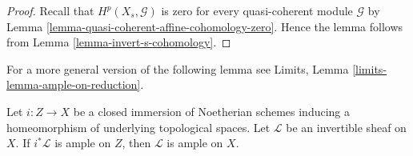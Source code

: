 \begin{proof}
Recall that $H^p(X_s, \mathcal{G})$ is zero for every quasi-coherent
module $\mathcal{G}$ by
Lemma \ref{lemma-quasi-coherent-affine-cohomology-zero}.
Hence the lemma follows from
Lemma \ref{lemma-invert-s-cohomology}.
\end{proof}

\noindent
For a more general version of the following lemma see
Limits, Lemma \ref{limits-lemma-ample-on-reduction}.

\begin{lemma}
\label{lemma-ample-on-reduction}
Let $i : Z \to X$ be a closed immersion of Noetherian schemes
inducing a homeomorphism of underlying topological spaces.
Let $\mathcal{L}$ be an invertible sheaf on $X$.
If $i^*\mathcal{L}$ is ample on $Z$, then $\mathcal{L}$ is ample on $X$.
\end{lemma}


